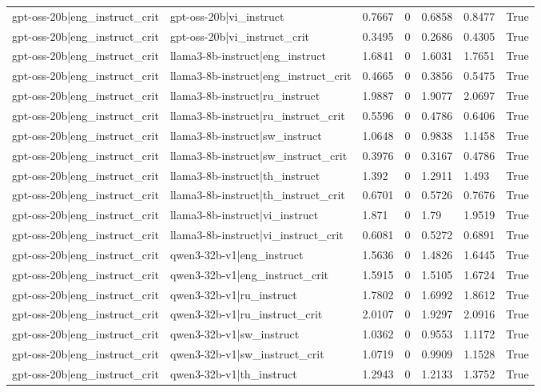 \begin{table}
\begin{tabular}{llllllr}
gpt-oss-20b|eng_instruct_crit & gpt-oss-20b|vi_instruct & 0.7667 & 0 & 0.6858 & 0.8477 & True \\
gpt-oss-20b|eng_instruct_crit & gpt-oss-20b|vi_instruct_crit & 0.3495 & 0 & 0.2686 & 0.4305 & True \\
gpt-oss-20b|eng_instruct_crit & llama3-8b-instruct|eng_instruct & 1.6841 & 0 & 1.6031 & 1.7651 & True \\
gpt-oss-20b|eng_instruct_crit & llama3-8b-instruct|eng_instruct_crit & 0.4665 & 0 & 0.3856 & 0.5475 & True \\
gpt-oss-20b|eng_instruct_crit & llama3-8b-instruct|ru_instruct & 1.9887 & 0 & 1.9077 & 2.0697 & True \\
gpt-oss-20b|eng_instruct_crit & llama3-8b-instruct|ru_instruct_crit & 0.5596 & 0 & 0.4786 & 0.6406 & True \\
gpt-oss-20b|eng_instruct_crit & llama3-8b-instruct|sw_instruct & 1.0648 & 0 & 0.9838 & 1.1458 & True \\
gpt-oss-20b|eng_instruct_crit & llama3-8b-instruct|sw_instruct_crit & 0.3976 & 0 & 0.3167 & 0.4786 & True \\
gpt-oss-20b|eng_instruct_crit & llama3-8b-instruct|th_instruct & 1.392 & 0 & 1.2911 & 1.493 & True \\
gpt-oss-20b|eng_instruct_crit & llama3-8b-instruct|th_instruct_crit & 0.6701 & 0 & 0.5726 & 0.7676 & True \\
gpt-oss-20b|eng_instruct_crit & llama3-8b-instruct|vi_instruct & 1.871 & 0 & 1.79 & 1.9519 & True \\
gpt-oss-20b|eng_instruct_crit & llama3-8b-instruct|vi_instruct_crit & 0.6081 & 0 & 0.5272 & 0.6891 & True \\
gpt-oss-20b|eng_instruct_crit & qwen3-32b-v1|eng_instruct & 1.5636 & 0 & 1.4826 & 1.6445 & True \\
gpt-oss-20b|eng_instruct_crit & qwen3-32b-v1|eng_instruct_crit & 1.5915 & 0 & 1.5105 & 1.6724 & True \\
gpt-oss-20b|eng_instruct_crit & qwen3-32b-v1|ru_instruct & 1.7802 & 0 & 1.6992 & 1.8612 & True \\
gpt-oss-20b|eng_instruct_crit & qwen3-32b-v1|ru_instruct_crit & 2.0107 & 0 & 1.9297 & 2.0916 & True \\
gpt-oss-20b|eng_instruct_crit & qwen3-32b-v1|sw_instruct & 1.0362 & 0 & 0.9553 & 1.1172 & True \\
gpt-oss-20b|eng_instruct_crit & qwen3-32b-v1|sw_instruct_crit & 1.0719 & 0 & 0.9909 & 1.1528 & True \\
gpt-oss-20b|eng_instruct_crit & qwen3-32b-v1|th_instruct & 1.2943 & 0 & 1.2133 & 1.3752 & True \\

\end{tabular}
\end{table}

